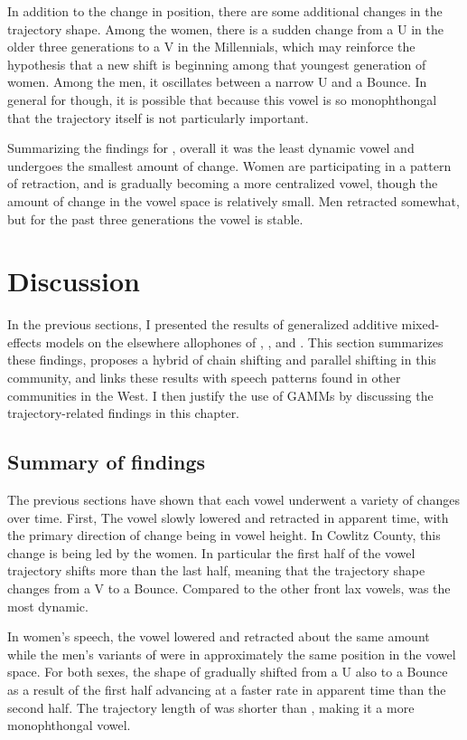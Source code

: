 In addition to the change in position, there are some additional changes in the trajectory shape. Among the women, there is a sudden change from a U in the older three generations to a V in the Millennials, which may reinforce the hypothesis that a new shift is beginning among that youngest generation of women. Among the men, it oscillates between a narrow U and a Bounce. In general for \bit though, it is possible that because this vowel is so monophthongal that the trajectory itself is not particularly important.

Summarizing the findings for \bit, overall it was the least dynamic vowel and undergoes the smallest amount of change. Women are participating in a pattern of retraction, and \bit is gradually becoming a more centralized vowel, though the amount of change in the vowel space is relatively small. Men retracted somewhat, but for the past three generations the vowel is stable.

\section{Discussion}
\label{sec:preobstruent_discussion}

In the previous sections, I presented the results of generalized additive mixed-effects models on the elsewhere allophones of \trap, \dress, and \kit. This section summarizes these findings, proposes a hybrid of chain shifting and parallel shifting in this community, and links these results with speech patterns found in other communities in the West. I then justify the use of GAMMs by discussing the trajectory-related findings in this chapter.

\subsection{Summary of findings}
\label{bat_bet_bit_summary}

The previous sections have shown that each vowel underwent a variety of changes over time. First, The \bat vowel slowly lowered and retracted in apparent time, with the primary direction of change being in vowel height. In Cowlitz County, this change is being led by the women. In particular the first half of the vowel trajectory shifts more than the last half, meaning that the trajectory shape changes from a V to a Bounce. Compared to the other front lax vowels, \bat was the most dynamic.

In women's speech, the \bet vowel lowered and retracted about the same amount while the men's variants of \bet were in approximately the same position in the vowel space. For both sexes, the shape of \bet gradually shifted from a U also to a Bounce as a result of the first half advancing at a faster rate in apparent time than the second half. The trajectory length of \bet was shorter than \bat, making it a more monophthongal vowel.


